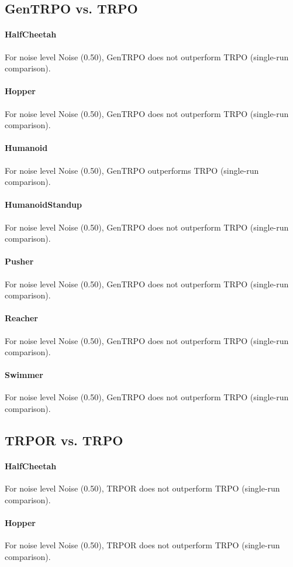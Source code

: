 \subsection{GenTRPO vs. TRPO}
\paragraph{HalfCheetah}
For noise level Noise (0.50), GenTRPO does not outperform TRPO (single-run comparison).
\paragraph{Hopper}
For noise level Noise (0.50), GenTRPO does not outperform TRPO (single-run comparison).
\paragraph{Humanoid}
For noise level Noise (0.50), GenTRPO outperforms TRPO (single-run comparison).
\paragraph{HumanoidStandup}
For noise level Noise (0.50), GenTRPO does not outperform TRPO (single-run comparison).
\paragraph{Pusher}
For noise level Noise (0.50), GenTRPO does not outperform TRPO (single-run comparison).
\paragraph{Reacher}
For noise level Noise (0.50), GenTRPO does not outperform TRPO (single-run comparison).
\paragraph{Swimmer}
For noise level Noise (0.50), GenTRPO does not outperform TRPO (single-run comparison).
\subsection{TRPOR vs. TRPO}
\paragraph{HalfCheetah}
For noise level Noise (0.50), TRPOR does not outperform TRPO (single-run comparison).
\paragraph{Hopper}
For noise level Noise (0.50), TRPOR does not outperform TRPO (single-run comparison).

